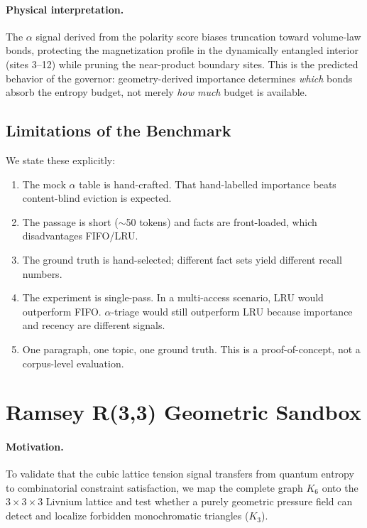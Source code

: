 \documentclass{article}
\begin{document}
\paragraph{Physical interpretation.}
The $\alpha$ signal derived from the polarity score biases truncation toward volume-law bonds, protecting the magnetization profile in the dynamically entangled interior (sites 3--12) while pruning the near-product boundary sites.
This is the predicted behavior of the governor: geometry-derived importance determines \emph{which} bonds absorb the entropy budget, not merely \emph{how much} budget is available.

\subsection{Limitations of the Benchmark}

We state these explicitly:

\begin{enumerate}[nosep,leftmargin=*]
  \item The mock $\alpha$ table is hand-crafted.  That hand-labelled importance beats content-blind eviction is expected.
  \item The passage is short ($\sim$50 tokens) and facts are front-loaded, which disadvantages FIFO/LRU.
  \item The ground truth is hand-selected; different fact sets yield different recall numbers.
  \item The experiment is single-pass.  In a multi-access scenario, LRU would outperform FIFO.  $\alpha$-triage would still outperform LRU because importance and recency are different signals.
  \item One paragraph, one topic, one ground truth.  This is a proof-of-concept, not a corpus-level evaluation.
\end{enumerate}

\section{Ramsey R(3,3) Geometric Sandbox}
\label{sec:ramsey}

\paragraph{Motivation.}
To validate that the cubic lattice tension signal transfers from quantum entropy to
combinatorial constraint satisfaction, we map the complete graph $K_6$ onto the
$3\!\times\!3\!\times\!3$ Livnium lattice and test whether a purely geometric pressure
field can detect and localize forbidden monochromatic triangles ($K_3$).
\end{document}
